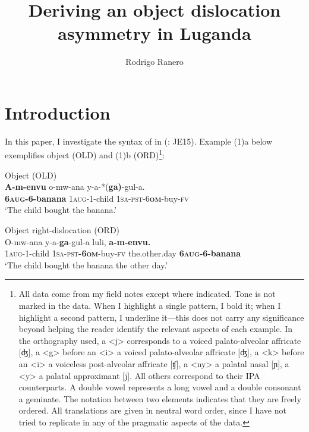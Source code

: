 \documentclass[output=paper
,newtxmath
,modfonts
,nonflat]{langsci/langscibook}
\title{Deriving an object dislocation asymmetry in Luganda}
\author{Rodrigo Ranero
\affiliation{University of Maryland}}
\begin{document}
\maketitle

\section{Introduction}\label{sec:ranero:1}

In this paper, I investigate the syntax of  in  (: JE15). Example (1)a below exemplifies object  (OLD) and (1)b  (ORD)\footnote{All data come from my field notes except where indicated. Tone is not marked in the data. When I highlight a single pattern, I bold it; when I highlight a second pattern, I underline it—this does not carry any significance beyond helping the reader identify the relevant aspects of each example. In the orthography used, a <j> corresponds to a voiced palato-alveolar affricate [ʤ], a <g> before an <i> a voiced palato-alveolar affricate [ʤ], a <k> before an <i> a voiceless post-alveolar affricate [ʧ], a <ny> a palatal nasal [ɲ], a <y> a palatal approximant [j]. All others correspond to their IPA counterparts. A double vowel represents a long vowel and a double consonant a geminate. The notation {\textbar}{\textbar} between two elements indicates that they are freely ordered.  All translations are given in neutral word order, since I have not tried to replicate in  any of the pragmatic aspects of the  data.}:

\ea\label{ex:ranero:1} 
\ea\label{ex:ranero:1a} Object  (OLD)\\
\gll \textbf{A-m-envu} o-mw-ana y-a-*(\textbf{ga)}{}-gul-a.\\          
\textbf{6\textsc{aug}}\textbf{{}-6-banana} 1\textsc{aug}{}-1-child 1\textsc{sa}{}-\textsc{pst}{}-6\textbf{\textsc{om}}{}-buy\textsc{{}-fv}\\
\glt ‘The child bought the banana.’   

\ex\label{ex:ranero:1b} Object right-dislocation (ORD)\\
\gll O-mw-ana      y-a-\textbf{ga}{}-gul-a       luli,       \textbf{a-m-envu.}\\
1\textsc{aug}{}-1-child \textsc{1sa-pst}\textbf{{}-6}\textbf{\textsc{om}}{}-buy-\textsc{fv} the.other.day \textbf{6\textsc{aug}}\textbf{{}-6-banana}\\
\glt ‘The child bought the banana the other day.’ 
\z
\z
\end{document}
